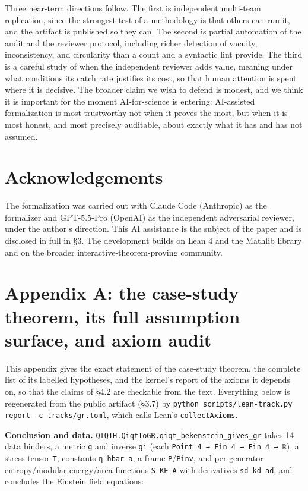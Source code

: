 \documentclass[11pt]{article}
\begin{document}
Three near-term directions follow. The first is independent multi-team replication, since the
strongest test of a methodology is that others can run it, and the artifact is published so they can.
The second is partial automation of the audit and the reviewer protocol, including richer detection
of vacuity, inconsistency, and circularity than a count and a syntactic lint provide. The third is a
careful study of when the independent reviewer adds value, meaning under what conditions its catch
rate justifies its cost, so that human attention is spent where it is decisive. The broader claim we
wish to defend is modest, and we think it is important for the moment AI-for-science is entering:
AI-assisted formalization is most trustworthy not when it proves the most, but when it is most
honest, and most precisely auditable, about exactly what it has and has not assumed.

\section*{Acknowledgements}

The formalization was carried out with Claude Code (Anthropic) as the formalizer and GPT-5.5-Pro
(OpenAI) as the independent adversarial reviewer, under the author's direction. This AI assistance
is the subject of the paper and is disclosed in full in §3. The development builds on Lean 4 and the
Mathlib library and on the broader interactive-theorem-proving community.

\section{Appendix A: the case-study theorem, its full assumption surface, and axiom audit}

This appendix gives the exact statement of the case-study theorem, the complete list of its labelled
hypotheses, and the kernel's report of the axioms it depends on, so that the claims of §4.2 are
checkable from the text. Everything below is regenerated from the public artifact (§3.7) by
\texttt{python scripts/lean-track.py report -c tracks/gr.toml}, which calls Lean's \texttt{collectAxioms}.

\textbf{Conclusion and data.} \texttt{QIQTH.QiqtToGR.qiqt\_bekenstein\_gives\_gr} takes 14 data binders, a metric
\texttt{g} and inverse \texttt{gi} (each \texttt{Point 4 → Fin 4 → Fin 4 → ℝ}), a stress tensor \texttt{T}, constants \texttt{η hbar a},
a frame \texttt{P}/\texttt{Pinv}, and per-generator entropy/modular-energy/area functions \texttt{S KE A} with derivatives
\texttt{sd kd ad}, and concludes the Einstein field equations:
\end{document}
